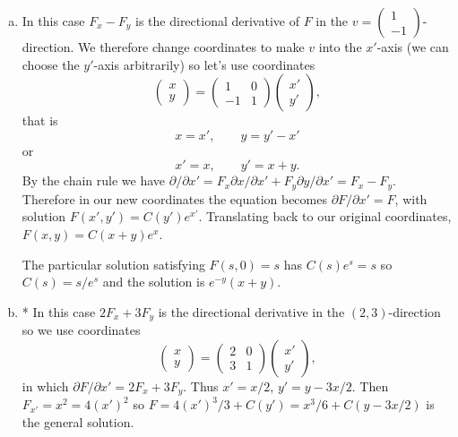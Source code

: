 \documentclass[12pt]{article}
\begin{document}
\iffalse
\begin{answer}
\begin{enumerate}[(a)]
\item In this case $F_x-F_y$ is the directional derivative of $F$ in the $v=\left(\begin{array}{c}1\\ -1\end{array}\right)$-direction. We therefore change coordinates to make $v$ into the $x'$-axis (we can choose the $y'$-axis arbitrarily) so let's use coordinates
\[\left(\begin{array}{c}
x\\ y
\end{array}\right)=\left(\begin{array}{cc}1 & 0\\ -1 & 1\end{array}\right)\left(\begin{array}{c}x' \\ y'\end{array}\right),\]
that is
\[x=x',\qquad y=y'-x'\]
or
\[x'=x,\qquad y'=x+y.\]
By the chain rule we have $\partial/\partial x'=F_x\partial x/\partial x'+F_y\partial y/\partial x'=F_x-F_y$. Therefore in our new coordinates the equation becomes $\partial F/\partial x'=F$, with solution $F(x',y')=C(y')e^{x'}$. Translating back to our original coordinates, $F(x,y)=C(x+y)e^x$.

The particular solution satisfying $F(s,0)=s$ has $C(s)e^s=s$ so $C(s)=s/e^s$ and the solution is $e^{-y}(x+y)$.
\item * In this case $2F_x+3F_y$ is the directional derivative in the $(2,3)$-direction so we use coordinates
\[\left(\begin{array}{c}
x\\ y
\end{array}\right)=\left(\begin{array}{cc}2 & 0\\ 3 & 1\end{array}\right)\left(\begin{array}{c}x' \\ y'\end{array}\right),\]
in which $\partial F/\partial x'=2F_x+3F_y$. Thus $x'=x/2$, $y'=y-3x/2$. Then $F_{x'}=x^2=4(x')^2$ so $F=4(x')^3/3+C(y')=x^3/6+C(y-3x/2)$ is the general solution.


\end{enumerate}
\end{answer}
\end{document}
